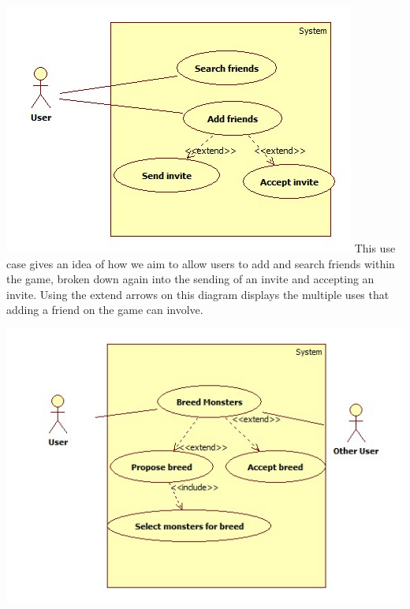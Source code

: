\documentclass[a4paper]{article}
\begin{document}
\begin{center}
\includegraphics[width=\textwidth]{img/UseCaseFriends.jpg}
This use case gives an idea of how we aim to allow users to add and search friends within the game, broken down again into the sending of an invite and accepting an invite. Using the extend arrows on this diagram displays the multiple uses that adding a friend on the game can involve.

\includegraphics[width=\textwidth]{img/UseCaseBreed.jpg}


\end{center}
\end{document}
